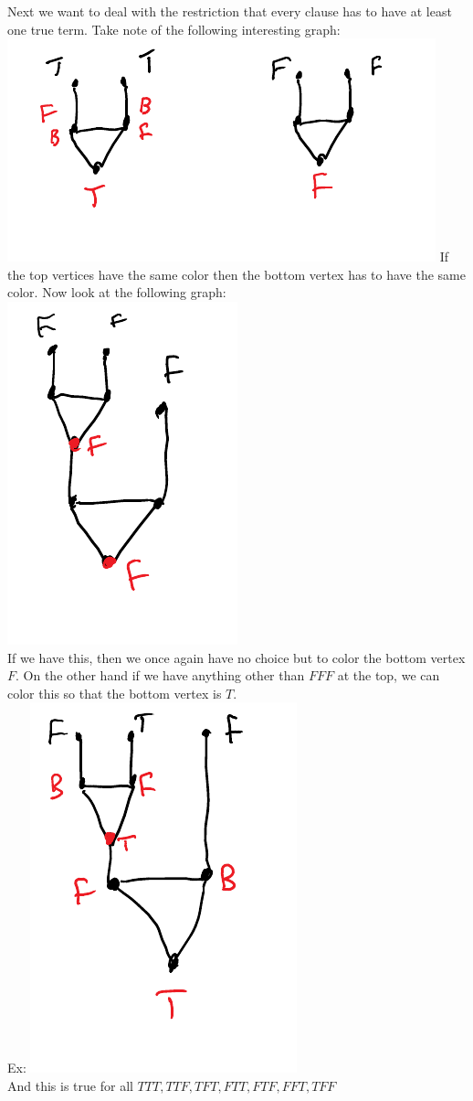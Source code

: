 \documentclass[12 pt]{article}
\begin{document}
          Next we want to deal with the restriction that every clause
          has to have at least one true term. Take note of the
          following interesting graph:
          \\ \includegraphics[width=.9\textwidth]{i136.pdf}
          If the top vertices have the same color then the bottom
          vertex has to have the same color. Now look at the following
          graph:
          \\ \includegraphics[width=.4\textwidth]{i137.pdf}
          \\If we have this, then we once again have no choice but to
          color the bottom vertex $F$. On the other hand if we have
          anything other than $FFF$ at the top, we can color this so
          that the bottom vertex is $T$.
          \\ Ex: \includegraphics[width=.4\textwidth]{i138.pdf}
          \\ And this is true for all $TTT, TTF, TFT, FTT, FTF, FFT,
          TFF$
\end{document}
